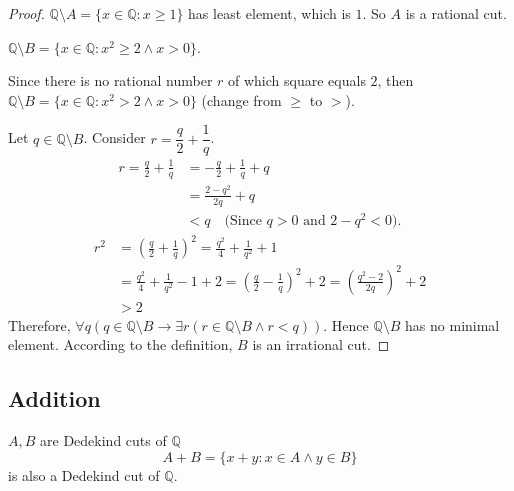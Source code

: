 \begin{proof}
    $\mathbb{Q}\setminus A = \{ x\in\mathbb{Q}: x\ge 1 \}$ has least element, which is $1$. So $ A$ is a rational cut.
    \bigskip

    $\mathbb{Q}\setminus B = \{ x\in\mathbb{Q}: {x}^{2}\ge 2 \wedge x > 0 \}$.

    Since there is no rational number $r$ of which square equals $2$, then $\mathbb{Q}\setminus B = \{ x\in\mathbb{Q}: {x}^{2} > 2 \wedge x > 0 \}$ (change from $\ge$ to $>$).

    Let $q\in\mathbb{Q}\setminus B$. Consider $r = \dfrac{q}{2} + \dfrac{1}{q}$.
    \begin{align*}
        r = \frac{q}{2} + \frac{1}{q} & = -\frac{q}{2} + \frac{1}{q} + q                       \\
                                      & = \frac{2 - {q}^{2}}{2q} + q                           \\
                                      & < q \quad\text{(Since $q > 0$ and $2 - {q}^{2} < 0$)}.
    \end{align*}
    \begin{align*}
        {r}^{2} & = {\left(\frac{q}{2} + \frac{1}{q}\right)}^{2} = \frac{q^{2}}{4} + \frac{1}{q^{2}} + 1                                                         \\
                & = \frac{q^{2}}{4} + \frac{1}{q^{2}} - 1 + 2 = {\left(\frac{q}{2} - \frac{1}{q}\right)}^{2} + 2 = {\left( \frac{q^{2} - 2}{2q} \right)}^{2} + 2 \\
                & > 2
    \end{align*}
    Therefore, $\forall q(q\in\mathbb{Q}\setminus B \rightarrow \exists r( r\in\mathbb{Q}\setminus B \wedge r < q ))$. Hence $\mathbb{Q}\setminus B$ has no minimal element. According to the definition, $ B$ is an irrational cut.
\end{proof}

\subsection{Addition}

\begin{theorem}[Addition]
    $A, B$ are Dedekind cuts of $\mathbb{Q}$
    \[
        A + B = \{ x + y : x\in A \wedge y\in B \}
    \]
    is also a Dedekind cut of $\mathbb{Q}$.
\end{theorem}

